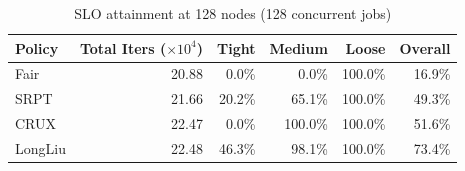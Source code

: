 \begin{table}[t]
\centering
\caption{SLO attainment at 128 nodes (128 concurrent jobs)}
\label{tab:slo_128host}
\begin{tabular}{l|r|r|r|r|r}
\hline
Policy & Total Iters ($\times 10^4$) & Tight & Medium & Loose & Overall \\
\hline
Fair & 20.88 & 0.0\% & 0.0\% & 100.0\% & 16.9\% \\
SRPT & 21.66 & 20.2\% & 65.1\% & 100.0\% & 49.3\% \\
CRUX & 22.47 & 0.0\% & 100.0\% & 100.0\% & 51.6\% \\
LongLiu & 22.48 & 46.3\% & 98.1\% & 100.0\% & 73.4\% \\
\hline
\end{tabular}
\end{table}
